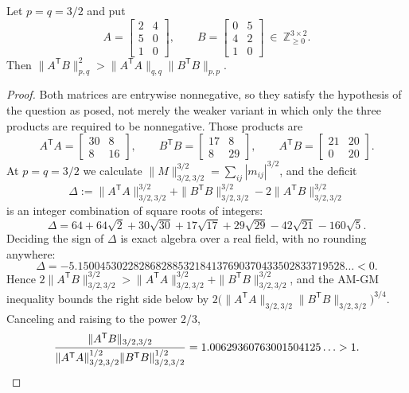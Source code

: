 \begin{cxrefutation}
\begin{theorem}\label{thm:mixed-general}
Let $p=q=3/2$ and put
\[
A=\begin{bmatrix}2&4\\5&0\\1&0\end{bmatrix},\qquad
B=\begin{bmatrix}0&5\\4&2\\1&0\end{bmatrix}\ \in\ \mathbb Z_{\ge0}^{3\times2}.
\]
Then $\|A^{\mathsf T}B\|_{p,q}^2>\|A^{\mathsf T}A\|_{q,q}\|B^{\mathsf T}B\|_{p,p}$.
\end{theorem}
\begin{proof}
Both matrices are entrywise nonnegative, so they satisfy the hypothesis of the question as posed, not merely the weaker variant in which only the three products are required to be nonnegative.  Those products are
\[
A^{\mathsf T}A=\begin{bmatrix}30&8\\8&16\end{bmatrix},\qquad
B^{\mathsf T}B=\begin{bmatrix}17&8\\8&29\end{bmatrix},\qquad
A^{\mathsf T}B=\begin{bmatrix}21&20\\0&20\end{bmatrix}.
\]
At $p=q=3/2$ we calculate $\|M\|_{3/2,3/2}^{3/2}=\sum_{ij}|m_{ij}|^{3/2}$, and the deficit
\[
\Delta:=\|A^{\mathsf T}A\|_{3/2,3/2}^{3/2}+\|B^{\mathsf T}B\|_{3/2,3/2}^{3/2}-2\|A^{\mathsf T}B\|_{3/2,3/2}^{3/2}
\]
is an integer combination of square roots of integers:
\[
\Delta=64+64\sqrt2+30\sqrt{30}+17\sqrt{17}+29\sqrt{29}-42\sqrt{21}-160\sqrt5 .
\]
Deciding the sign of $\Delta$ is exact algebra over a real field, with no rounding anywhere:
\[
\Delta=-5.150045302282868288532184137690370433502833719528\ldots<0 .
\]
Hence $2\|A^{\mathsf T}B\|_{3/2,3/2}^{3/2}>\|A^{\mathsf T}A\|_{3/2,3/2}^{3/2}+\|B^{\mathsf T}B\|_{3/2,3/2}^{3/2}$, and the AM-GM inequality bounds the right side below by $2\bigl(\|A^{\mathsf T}A\|_{3/2,3/2}\|B^{\mathsf T}B\|_{3/2,3/2}\bigr)^{3/4}$.  Canceling and raising to the power $2/3$,
\[
\frac{\|A^{\mathsf T}B\|_{3/2,3/2}}{\|A^{\mathsf T}A\|_{3/2,3/2}^{1/2}\|B^{\mathsf T}B\|_{3/2,3/2}^{1/2}}=1.00629360763001504125\ldots>1 . \qedhere
\]
\end{proof}


\end{cxrefutation}
